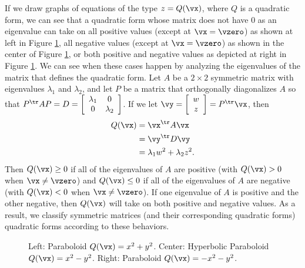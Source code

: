 If we draw graphs of equations of the type $z=Q(\vx)$, where $Q$ is a quadratic form, we can see that a quadratic form whose matrix does not have 0 as an eigenvalue can take on all positive values (except at $\vx=\vzero$) as shown at left in Figure \ref{F:7_b_Paraboloids}, all negative values (except at $\vx=\vzero$) as shown in the center of  Figure \ref{F:7_b_Paraboloids}, or both positive and negative values as depicted at right in Figure \ref{F:7_b_Paraboloids}. We can see when these cases happen by analyzing the eigenvalues of the matrix that defines the quadratic form. Let $A$ be a $2 \times 2$ symmetric matrix with eigenvalues $\lambda_1$ and $\lambda_2$, and let $P$ be a matrix that orthogonally diagonalizes $A$ so that $P^{\tr}AP = D = \left[ \begin{array}{cc} \lambda_1 & 0 \\ 0 & \lambda_2 \end{array} \right]$. If we let $\vy = \left[ \begin{array}{c} w\\z \end{array} \right] = P^{\tr}\vx$, then \begin{align*}
Q(\vx) &= \vx^{\tr}A\vx \\
	&= \vy^{\tr} D \vy \\
	&= \lambda_1 w^2 + \lambda_2 z^2.
\end{align*}
Then $Q(\vx) \geq 0$ if all of the eigenvalues of $A$ are positive (with $Q(\vx) > 0$ when $\vx \neq \vzero$) and $Q(\vx) \leq 0$  if all of the eigenvalues of $A$ are negative (with $Q(\vx) < 0$ when $\vx \neq \vzero$). If one eigenvalue of $A$ is positive and the other negative, then $Q(\vx)$ will take on both positive and negative values. As a result, we classify symmetric matrices (and their corresponding quadratic forms)  quadratic forms according to these behaviors.
\begin{figure}[h]
\begin{center}
\caption{Left: Paraboloid $Q(\vx)=x^2+y^2$. Center: Hyperbolic Paraboloid $Q(\vx)=x^2-y^2$. Right: Paraboloid $Q(\vx) = -x^2 - y^2$.}
\label{F:7_b_Paraboloids}
\end{center}
\end{figure}



